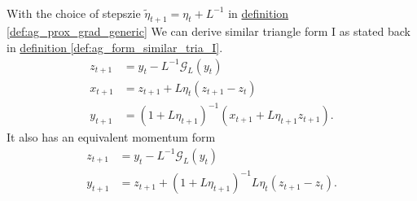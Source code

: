         \begin{lemma}
            \quad \\
            With the choice of stepszie $\tilde \eta_{t + 1} = \eta_t + L^{-1}$ 
            in 
            \hyperref[def:ag_prox_grad_generic]{definition \ref*{def:ag_prox_grad_generic}}
            We can derive similar triangle form I as stated back in
            \hyperref[def:ag_form_similar_tria_I]{definition \ref*{def:ag_form_similar_tria_I}}. 
            \begin{align*}
                z_{t + 1} &= y_t - L^{-1} \mathcal G_L(y_t)
                \\
                x_{t + 1} &= z_{t + 1} + L\eta_t (z_{t + 1} - z_t)
                \\
                y_{t + 1} &= 
                (1 + L\eta_{t + 1})^{-1}
                (
                x_{t + 1} + L\eta_{t + 1}z_{t + 1}
                ). 
            \end{align*}
            It also has an equivalent momentum form 
            \begin{align*}
                z_{t + 1} &= y_t - L^{-1}\mathcal G_L(y_t)
                \\
                y_{t + 1} &= z_{t + 1} + (1 + L\eta_{t + 1})^{-1}L\eta_t (z_{t + 1} - z_t). 
            \end{align*}
        \end{lemma}
